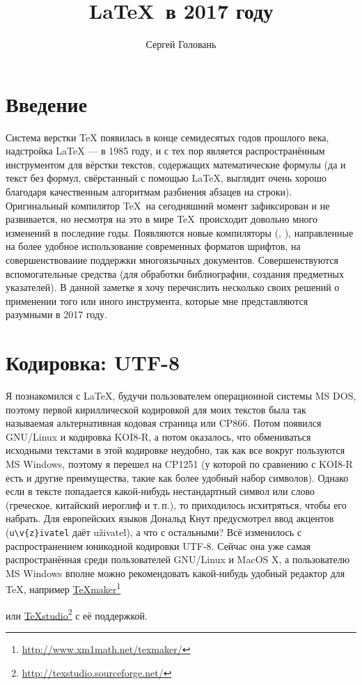\documentclass[a4paper,12pt]{article}
\title{\LaTeX\ в 2017 году}
\author{Сергей Головань}
\newcommand\foothref[2]{%
  \href{#1}{#2}\footnote{\url{#1}}%
}
\begin{document}
\maketitle
\tableofcontents

\section{Введение}
Система верстки \TeX{} появилась в конце семидесятых годов прошлого века,
надстройка \LaTeX{} --- в 1985 году, и с тех пор является распространённым
инструментом для вёрстки текстов, содержащих математические формулы (да и текст
без формул, свёрстанный с помощью \LaTeX, выглядит очень хорошо благодаря
качественным алгоритмам разбиения абзацев на строки). Оригинальный компилятор
\TeX\ на сегодняшний момент зафиксирован и не развивается, но несмотря на это
в мире \TeX\ происходит довольно много изменений в последние годы. Появляются
новые компиляторы (\XeTeX{}, \LuaTeX{}), направленные
на более удобное использование
современных форматов шрифтов, на совершенствование поддержки многоязычных
документов. Совершенствуются вспомогательные средства (для обработки
библиографии, создания предметных указателей). В данной заметке я хочу
перечислить несколько своих решений о применении того или иного инструмента,
которые мне представляются разумными в 2017 году.

\section{Кодировка: UTF-8}
Я познакомился с \LaTeX, будучи пользователем операционной системы MS DOS,
поэтому первой кириллической кодировкой для моих текстов была так называемая
альтернативная кодовая страница или CP866. Потом появился GNU/Linux и кодировка
KOI8-R, а потом оказалось, что обмениваться исходными текстами в этой кодировке
неудобно, так как все вокруг пользуются MS Windows, поэтому я перешел на
CP1251 (у которой по сравнению с KOI8-R есть и другие преимущества, такие как
более удобный набор символов). Однако если в тексте попадается какой-нибудь
нестандартный символ или слово (греческое, китайский иероглиф и т.\,п.), то
приходилось исхитряться, чтобы его набрать. Для европейских языков Дональд Кнут
предусмотрел ввод акцентов (\verb|u\v{z}ivatel| даёт u\v{z}ivatel), а что с
остальными? Всё изменилось с распространением юникодной кодировки UTF-8. Сейчас
она уже самая распространённая среди пользователей GNU/Linux и MacOS X,
а пользователю MS Windows вполне можно рекомендовать какой-нибудь удобный
редактор для \TeX, например \foothref{http://www.xm1math.net/texmaker/}{TeXmaker}
или \foothref{http://texstudio.sourceforge.net/}{TeXstudio} с её поддержкой.
\end{document}
